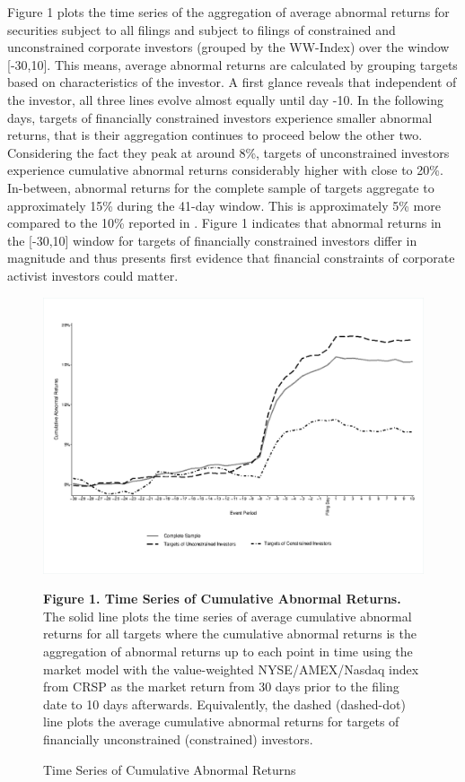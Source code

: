 \documentclass[12pt]{article}
\begin{document}
\noindent Figure 1 plots the time series of the aggregation of average abnormal returns for securities subject to all filings and subject to filings of constrained and unconstrained corporate investors (grouped by the WW-Index) over the window [-30,10]. This means, average abnormal returns are calculated by grouping targets based on characteristics of the investor. A first glance reveals that independent of the investor, all three lines evolve almost equally until day -10. In the following days, targets of financially constrained investors experience smaller abnormal returns, that is their aggregation continues to proceed below the other two. Considering the fact they peak at around 8\%, targets of unconstrained investors experience cumulative abnormal returns considerably higher with close to 20\%. In-between, abnormal returns for the complete sample of targets aggregate to approximately 15\% during the 41-day window. This is approximately 5\% more compared to the 10\% reported in \citet[p.1563]{Collin-Dufresne2015}. 
Figure 1 indicates that abnormal returns in the [-30,10] window for targets of financially constrained investors differ in magnitude and thus presents first evidence that financial constraints of corporate activist investors could matter.
\begin{figure}[!htb]
	\centering
	\captionsetup{textformat=empty,labelformat=blank}
	\caption{Time Series of Cumulative Abnormal Returns}
	\begin{adjustbox}{width=\textwidth}
		\includegraphics{WW-TimeS_copy.eps} \label{AR}
	\end{adjustbox}
	\justifying
	\noindent\footnotesize{}\textbf{Figure 1. Time Series of Cumulative Abnormal Returns.} The solid line plots the time series of average cumulative abnormal returns for all targets where the cumulative abnormal returns is the aggregation of abnormal returns up to each point in time using the market model with the value-weighted NYSE/AMEX/Nasdaq index from CRSP as the market return from 30 days prior to the filing date to 10 days afterwards. Equivalently, the dashed (dashed-dot) line plots the average cumulative abnormal returns for targets of financially unconstrained (constrained) investors. \par\medskip
\end{figure}
\end{document}
